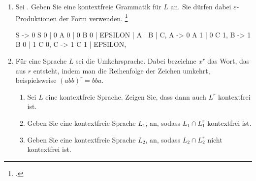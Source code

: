 \documentclass{bschlangaul-aufgabe}
\begin{document}

\begin{enumerate}


\item Sei . Geben Sie eine kontextfreie Grammatik für $L$
an. Sie dürfen dabei $\varepsilon$-Produktionen der Form
 verwenden.
\footcite{examen:66115:2020:09}

\begin{bAntwort}
\begin{bProduktionsRegeln}
S -> 0 S 0 | 0 A 0 | 0 B 0 | EPSILON | A | B | C,
A -> 0 A 1 | 0 C 1,
B -> 1 B 0 | 1 C 0,
C -> 1 C 1 | EPSILON,
\end{bProduktionsRegeln}
\end{bAntwort}


\item Für eine Sprache $L$ sei  die
Umkehrsprache. Dabei bezeichne $x^r$ das Wort, das aus $r$ entsteht,
indem man die Reihenfolge der Zeichen umkehrt, beispielsweise $(abb)^r =
bba$.

\begin{enumerate}


\item Sei $L$ eine kontextfreie Sprache. Zeigen Sie, dass dann auch
$L^r$ kontextfrei ist.


\item Geben Sie eine kontextfreie Sprache $L_1$, an, sodass $L_1 \cap
L^r_1$ kontextfrei ist.


\item Geben Sie eine kontextfreie Sprache $L_2$, an, sodass $L_2 \cap
L^r_2$ nicht kontextfrei ist.

\end{enumerate}
\end{enumerate}
\end{document}
